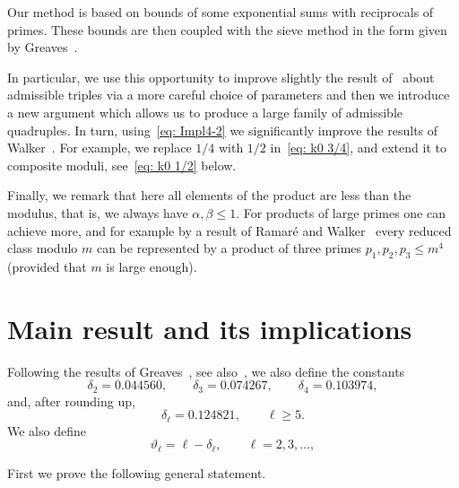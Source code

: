 \documentclass[12pt]{amsart}
\begin{document}
Our method is based on  bounds of some exponential sums with reciprocals of 
primes. 
These bounds are then
coupled with the sieve method in the form given by  
Greaves~\cite[Section~5]{Gre2}.

In particular, we use this opportunity to improve slightly the result of~\cite{Shp}
about admissible triples
via a more careful choice of parameters and then we introduce  a new argument
which allows us to produce a large family of  admissible quadruples.
In turn, using~\eqref{eq: Impl4-2} we 
significantly improve the results of Walker~\cite{Wal}. 
For example, we replace $1/4$ with $1/2$ in~\eqref{eq: k0 3/4}, 
and extend it to composite moduli, see~\eqref{eq: k0 1/2}  below. 

Finally, we remark that here all elements of the product are less than the modulus, that is, 
we always have $\alpha, \beta \le 1$. For products of large primes one can achieve more, 
and for example by a result of Ramar{\'e} and   Walker~\cite{RaWa} every reduced class modulo $m$ 
can be represented by a product of three primes $p_1, p_2, p_3 \le m^4$ (provided that $m$ is large enough).

\section{Main result and its implications}
\label{sec:main}

Following the results of Greaves~\cite[Equation~(1.4)]{Gre1}, see also~\cite[pp.~174--175]{Gre2}, 
we also define the constants
\begin{equation}
\label{eq:delta234}
\delta_2 = 0.044560, \qquad \delta_3 = 0.074267, 
\qquad \delta_4 = 0.103974, 
\end{equation}
and, after rounding up, 
$$
\delta_\ell = 0.124821, \qquad \ell \ge 5.
$$
We also define 
$$
\vartheta_\ell = \ell - \delta_\ell, \qquad \ell =2,3, \ldots, 
$$

First we prove the following general statement. 
\end{document}
